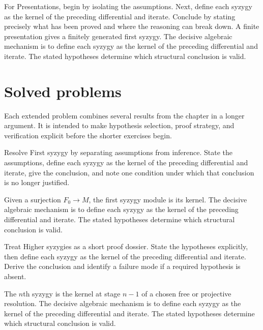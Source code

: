\begin{example}\label{ex:v24-worked-04}
For Presentations, begin by isolating the assumptions. Next, define each syzygy as the kernel of the preceding differential and iterate. Conclude by stating precisely what has been proved and where the reasoning can break down. A finite presentation gives a finitely generated first syzygy. The decisive algebraic mechanism is to define each syzygy as the kernel of the preceding differential and iterate. The stated hypotheses determine which structural conclusion is valid.
\end{example}

\section{Solved problems}
Each extended problem combines several results from the chapter in a longer argument. It is intended to make hypothesis selection, proof strategy, and verification explicit before the shorter exercises begin.

\begin{problem}\label{prob:v24-problem-01}
Resolve First syzygy by separating assumptions from inference. State the assumptions, define each syzygy as the kernel of the preceding differential and iterate, give the conclusion, and note one condition under which that conclusion is no longer justified.
\end{problem}
\begin{solution}
Given a surjection $F_0\to M$, the first syzygy module is its kernel. The decisive algebraic mechanism is to define each syzygy as the kernel of the preceding differential and iterate. The stated hypotheses determine which structural conclusion is valid.
\end{solution}

\begin{problem}\label{prob:v24-problem-02}
Treat Higher syzygies as a short proof dossier. State the hypotheses explicitly, then define each syzygy as the kernel of the preceding differential and iterate. Derive the conclusion and identify a failure mode if a required hypothesis is absent.
\end{problem}
\begin{solution}
The $n$th syzygy is the kernel at stage $n-1$ of a chosen free or projective resolution. The decisive algebraic mechanism is to define each syzygy as the kernel of the preceding differential and iterate. The stated hypotheses determine which structural conclusion is valid.
\end{solution}

